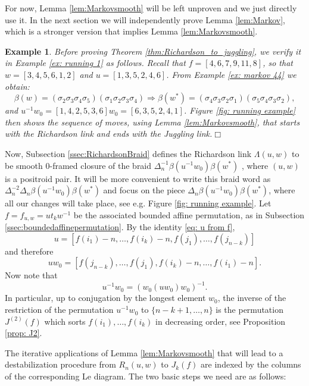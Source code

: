 \documentclass[10pt]{amsart}
\theoremstyle{plain}
\newtheorem{example}[thm]{Example}
\theoremstyle{definition}
\theoremstyle{remark}
\numberwithin{equation}{section}
\newcommand{\s}{\sigma}
\begin{document}
For now, Lemma \ref{lem:Markovsmooth} will be left unproven and we just directly use it. In the next section we will independently prove Lemma \ref{lem:Markov}, which is a stronger version that implies Lemma \ref{lem:Markovsmooth}.

\begin{example}
Before proving Theorem \ref{thm:Richardson_to_juggling}, we verify it in Example \ref{ex: running 1} as follows. Recall that $f = [4, 6, 7, 9, 11, 8]$, so that $w = [3,4,5,6,1,2]$ and $u = [1, 3, 5, 2, 4, 6]$. From Example \ref{ex: markov 44} we obtain:
    \[
    \beta(w) = (\s_2\s_3\s_4\s_5)(\s_1\s_2\s_3\s_4) \Rightarrow \beta(w^*) = (\s_4\s_3\s_2\s_1)(\s_5\s_4\s_3\s_2),
    \]
    and $u^{-1}w_0 = [1,4,2,5,3,6]w_0 = [6,3,5,2,4,1]$. Figure \ref{fig: running example} then shows the sequence of moves, using Lemma \ref{lem:Markovsmooth},  that starts with the Richardson link and ends with the Juggling link.\hfill$\Box$ 
\end{example}

Now, Subsection \ref{ssec:RichardsonBraid} defines the Richardson link $\Lambda(u,w)$ to be smooth 0-framed closure of the braid %
$\Delta_n^{-1}\beta(u^{-1}w_0)\beta(w^*)$
, where $(u,w)$ is a positroid pair. It will be more convenient to write this braid word as %
$\Delta_n^{-2}\Delta_n\beta(u^{-1}w_0)\beta(w^*)$
and focus on the piece %
$\Delta_n\beta(u^{-1}w_0)\beta(w^*)$, where all our changes will take place, see e.g. Figure \ref{fig: running example}. Let $f=f_{u,w} = ut_kw^{-1}$ be the associated bounded affine permutation, as in Subsection \ref{ssec:boundedaffinepermutation}. By the identity \eqref{eq: u from f},
$$
u=[f(i_1)-n,\ldots,f(i_k)-n,f(j_1),\ldots,f(j_{n-k})]
$$
and therefore 
$$
uw_0=[f(j_{n-k}),\ldots,f(j_1),f(i_k)-n,\ldots,f(i_1)-n].
$$
Now note that 
\begin{equation}\label{eq: u-1w_0}
u^{-1}w_0 = (w_0(uw_0)w_0)^{-1}.
\end{equation}
In particular, up to conjugation by the longest element $w_0$, the inverse of the restriction of the permutation $u^{-1}w_0$ to $\{n-k+1,\ldots,n\}$ is the permutation $J^{(2)}(f)$ which sorts $f(i_1),\ldots,f(i_k)$ in decreasing order, see Proposition \ref{prop: J2}. 

The iterative applications of Lemma \ref{lem:Markovsmooth} that will lead to a destabilization procedure from $R_n(u,w)$ to $J_k(f)$ are indexed by the columns of the corresponding Le diagram. The two basic steps we need are as follows:
\end{document}
